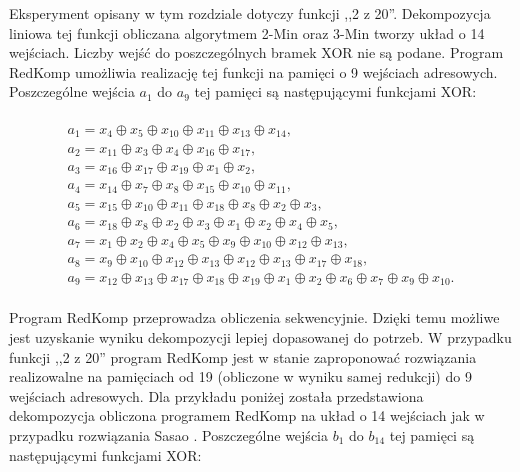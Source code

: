 Eksperyment opisany w tym rozdziale dotyczy funkcji ,,2 z 20''.
Dekompozycja liniowa tej funkcji obliczana algorytmem 2-Min oraz 3-Min \cite{sasao-s-min} tworzy układ o 14 wejściach.
Liczby wejść do poszczególnych bramek XOR nie są podane.
Program RedKomp umożliwia realizację tej funkcji na pamięci o 9 wejściach adresowych.
Poszczególne wejścia $a_1$ do $a_9$ tej pamięci są następującymi funkcjami XOR:

\begin{multline} \\
a_1 = x_{4} \oplus x_{5} \oplus x_{10} \oplus x_{11} \oplus x_{13} \oplus x_{14}, \\
a_2 = x_{11} \oplus x_{3} \oplus x_{4} \oplus x_{16} \oplus x_{17}, \\
a_3 = x_{16} \oplus x_{17} \oplus x_{19} \oplus x_{1} \oplus x_{2}, \\
a_4 = x_{14} \oplus x_{7} \oplus x_{8} \oplus x_{15} \oplus x_{10} \oplus x_{11}, \\
a_5 = x_{15} \oplus x_{10} \oplus x_{11} \oplus x_{18} \oplus x_{8} \oplus x_{2} \oplus x_{3}, \\
a_6 = x_{18} \oplus x_{8} \oplus x_{2} \oplus x_{3} \oplus x_{1} \oplus x_{2} \oplus x_{4} \oplus x_{5}, \\
a_7 = x_{1} \oplus x_{2} \oplus x_{4} \oplus x_{5} \oplus x_{9} \oplus x_{10} \oplus x_{12} \oplus x_{13}, \\
a_8 = x_{9} \oplus x_{10} \oplus x_{12} \oplus x_{13} \oplus x_{12} \oplus x_{13} \oplus x_{17} \oplus x_{18}, \\
a_9 = x_{12} \oplus x_{13} \oplus x_{17} \oplus x_{18} \oplus x_{19} \oplus x_{1} \oplus x_{2} \oplus x_{6} \oplus x_{7} \oplus x_{9} \oplus x_{10}. \\
\end{multline}

Program RedKomp przeprowadza obliczenia sekwencyjnie.
Dzięki temu możliwe jest uzyskanie wyniku dekompozycji lepiej dopasowanej do potrzeb.
W przypadku funkcji ,,2 z 20''
program RedKomp jest w stanie zaproponować rozwiązania realizowalne na pamięciach
od 19 (obliczone w wyniku samej redukcji) do 9 wejściach adresowych.
Dla przykładu poniżej została przedstawiona dekompozycja obliczona programem RedKomp na układ o 14 wejściach jak w przypadku rozwiązania Sasao \cite{sasao-s-min}.
Poszczególne wejścia $b_1$ do $b_{14}$ tej pamięci są następującymi funkcjami XOR:


